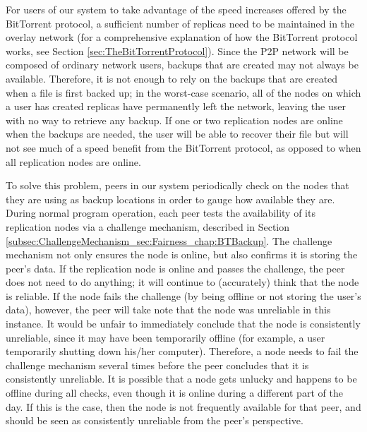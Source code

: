 \documentclass[12pt]{report}
\begin{document}
For users of our system to take advantage of the speed increases offered by the BitTorrent protocol, a sufficient number of replicas need to be maintained in the overlay network (for a comprehensive explanation of how the BitTorrent protocol works, see Section \ref{sec:TheBitTorrentProtocol}). Since the P2P network will be composed of ordinary network users, backups that are created may not always be available. Therefore, it is not enough to rely on the backups that are created when a file is first backed up; in the worst-case scenario, all of the nodes on which a user has created replicas have permanently left the network, leaving the user with no way to retrieve any backup. If one or two replication nodes are online when the backups are needed, the user will be able to recover their file but will not see much of a speed benefit from the BitTorrent protocol, as opposed to when all replication nodes are online.

To solve this problem, peers in our system periodically check on the nodes that they are using as backup locations in order to gauge how available they are. During normal program operation, each peer tests the availability of its replication nodes via a challenge mechanism, described in Section \ref{subsec:ChallengeMechanism_sec:Fairness_chap:BTBackup}. The challenge mechanism not only ensures the node is online, but also confirms it is storing the peer's data. If the replication node is online and passes the challenge, the peer does not need to do anything; it will continue to (accurately) think that the node is reliable. If the node fails the challenge (by being offline or not storing the user's data), however, the peer will take note that the node was unreliable in this instance. It would be unfair to immediately conclude that the node is consistently unreliable, since it may have been temporarily offline (for example, a user temporarily shutting down his/her computer). Therefore, a node needs to fail the challenge mechanism several times before the peer concludes that it is consistently unreliable. It is possible that a node gets unlucky and happens to be offline during all checks, even though it is online during a different part of the day. If this is the case, then the node is not frequently available for that peer, and should be seen as consistently unreliable from the peer's perspective.
\end{document}
